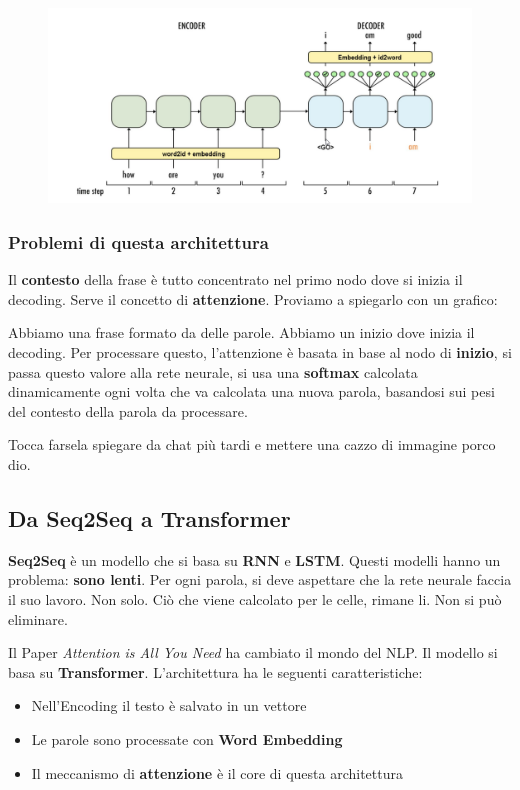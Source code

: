 \begin{figure}[H]
    \begin{center}
        \includegraphics[width=0.8\linewidth]{images/seq2seq.png}
    \end{center}
\end{figure}


\subsubsection{Problemi di questa architettura}

Il \textbf{contesto} della frase è tutto concentrato nel primo nodo dove si inizia il decoding. Serve il concetto di \textbf{attenzione}.
Proviamo a spiegarlo con un grafico:


Abbiamo una frase formato da delle parole. Abbiamo un inizio dove inizia il decoding. Per processare questo, l'attenzione è basata in base al nodo di \textbf{inizio}, si passa questo valore 
alla rete neurale, si usa una \textbf{softmax} calcolata dinamicamente ogni volta che va calcolata una nuova parola, basandosi sui pesi del contesto della parola da processare.


Tocca farsela spiegare da chat più tardi e mettere una cazzo di immagine porco dio.


\subsection{Da Seq2Seq a Transformer}

\textbf{Seq2Seq} è un modello che si basa su \textbf{RNN} e \textbf{LSTM}. Questi modelli hanno un problema: \textbf{sono lenti}. Per ogni parola, si deve aspettare che la rete neurale
faccia il suo lavoro. Non solo. Ciò che viene calcolato per le celle, rimane li. Non si può eliminare.

Il Paper \textit{Attention is All You Need} ha cambiato il mondo del NLP. Il modello si basa su \textbf{Transformer}. L'architettura ha le seguenti caratteristiche:
\begin{itemize}
    \item Nell'Encoding il testo è salvato in un vettore 
    \item Le parole sono processate con \textbf{Word Embedding}
    \item Il meccanismo di \textbf{attenzione} è il core di questa architettura
\end{itemize}

